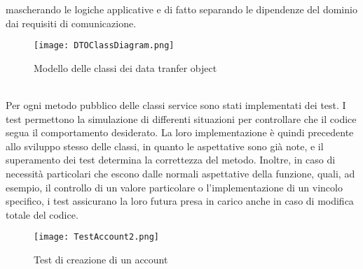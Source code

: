 mascherando le logiche applicative e di fatto separando le dipendenze del dominio dai requisiti di comunicazione.\\
\begin{figure}[h!]
    \begin{center}
        \texttt{[image: DTOClassDiagram.png]}
        \caption{Modello delle classi dei data tranfer object}
    \end{center}
\end{figure}
\\
Per ogni metodo pubblico delle classi service sono stati implementati dei test.
I test permettono la simulazione di differenti situazioni
per controllare che il codice segua il comportamento desiderato.
La loro implementazione è quindi precedente allo sviluppo stesso delle classi,
in quanto le aspettative sono già note, e il superamento dei test determina la correttezza del metodo.
Inoltre, in caso di necessità particolari che escono dalle normali aspettative della funzione,
quali, ad esempio, il controllo di un valore particolare o l'implementazione di un vincolo specifico,
i test assicurano la loro futura presa in carico anche in caso di modifica totale del codice.\\
\begin{figure}[h!]
    \begin{center}
        \texttt{[image: TestAccount2.png]}
        \caption{Test di creazione di un account}
    \end{center}
\end{figure}

\clearpage



